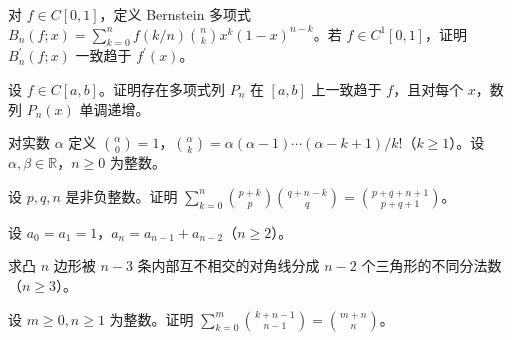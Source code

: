 \newpage
\noindent\begin{minipage}{\textwidth}
对 $f\in C[0,1]$，定义 Bernstein 多项式 $B_n(f;x)=\sum_{k=0}^nf(k/n)\binom nk x^k(1-x)^{n-k}$。若 $f\in C^1[0,1]$，证明 $B_n^{\prime}(f;x)$ 一致趋于 $f^{\prime}(x)$。
\end{minipage}\par\vfill
\noindent\begin{minipage}{\textwidth}
设 $f\in C[a,b]$。证明存在多项式列 $P_n$ 在 $[a,b]$ 上一致趋于 $f$，且对每个 $x$，数列 $P_n(x)$ 单调递增。
\end{minipage}\par\vfill
\noindent\begin{minipage}{\textwidth}
对实数 $\alpha$ 定义 $\binom\alpha0=1$，$\binom\alpha k=\alpha(\alpha-1)\cdots(\alpha-k+1)/k!$（$k\ge1$）。设 $\alpha,\beta\in\mathbb R$，$n\ge0$ 为整数。
\end{minipage}\par\vfill
\newpage
\noindent\begin{minipage}{\textwidth}
设 $p,q,n$ 是非负整数。证明 $\sum_{k=0}^n\binom{p+k}p\binom{q+n-k}q=\binom{p+q+n+1}{p+q+1}$。
\end{minipage}\par\vfill
\noindent\begin{minipage}{\textwidth}
设 $a_0=a_1=1$，$a_n=a_{n-1}+a_{n-2}$（$n\ge2$）。
\end{minipage}\par\vfill
\noindent\begin{minipage}{\textwidth}
求凸 $n$ 边形被 $n-3$ 条内部互不相交的对角线分成 $n-2$ 个三角形的不同分法数（$n\ge3$）。
\end{minipage}\par\vfill
\newpage
\noindent\begin{minipage}{\textwidth}
设 $m\ge0,n\ge1$ 为整数。证明 $\sum_{k=0}^m\binom{k+n-1}{n-1}=\binom{m+n}n$。
\end{minipage}\par\vfill
